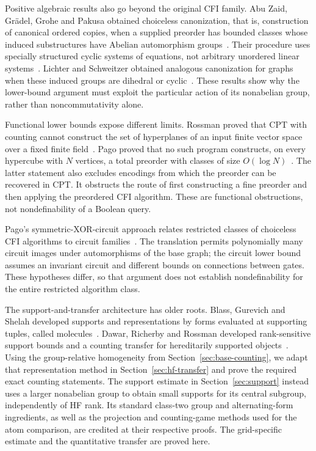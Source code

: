Positive algebraic results also go beyond the original CFI family.
Abu Zaid, Gr{\"a}del, Grohe and Pakusa obtained choiceless canonization,
that is, construction of canonical ordered copies, when a supplied preorder has bounded classes whose induced substructures
have Abelian automorphism groups~\cite[Corollary~19]{abuZaidGraedelGrohePakusa2014}.
Their procedure uses specially structured cyclic systems of equations,
not arbitrary unordered linear systems~\cite[Definition~6 and
Theorem~14]{abuZaidGraedelGrohePakusa2014}. Lichter and Schweitzer obtained
analogous canonization for graphs when these induced groups are dihedral
or cyclic~\cite[Theorem~1]{lichterSchweitzer2021}. These results show why
the lower-bound argument must exploit the particular action of its
nonabelian group, rather than noncommutativity alone.

Functional lower bounds expose different limits. Rossman proved that
CPT with counting cannot construct the set of hyperplanes of an input
finite vector space over a fixed finite
field~\cite[Theorem~6.1, author version]{rossman2010}.
Pago proved that no such program constructs, on every hypercube with
$N$ vertices, a total preorder with classes of size
$O(\log N)$~\cite[Theorem~2 and Corollary~3, full version]{pago2021}.
The latter statement also excludes encodings from which the preorder can
be recovered in CPT. It obstructs the route of first constructing a fine
preorder and then applying the preordered CFI algorithm. These are
functional obstructions, not nondefinability of a Boolean query.

Pago's symmetric-XOR-circuit approach relates restricted classes of
choiceless CFI algorithms to circuit
families~\cite[Theorems~2, 31 and~33, full version]{pago2023}.
The translation permits polynomially many circuit images under
automorphisms of the base graph; the circuit lower bound assumes an
invariant circuit and different bounds on connections between gates.
These hypotheses differ, so that argument does not establish
nondefinability for the entire restricted algorithm class.

The support-and-transfer architecture has older roots. Blass, Gurevich
and Shelah developed supports and representations by forms evaluated at
supporting tuples, called molecules~\cite[Sections~8--9, published
version]{bgs1999}. Dawar, Richerby and Rossman developed rank-sensitive
support bounds and a counting transfer for hereditarily supported
objects~\cite[Sections~7--8, 2007 author version]{drr2008}. Using the
group-relative homogeneity from Section~\ref{sec:base-counting}, we adapt
that representation method in Section~\ref{sec:hf-transfer} and prove the
required exact counting statements.
The support estimate in Section~\ref{sec:support} instead uses a larger
nonabelian group to obtain small supports for its central subgroup,
independently of HF rank. Its standard class-two group and
alternating-form ingredients, as well as the projection and counting-game
methods used for the atom comparison, are credited at their respective
proofs. The grid-specific estimate and the quantitative transfer are
proved here.

